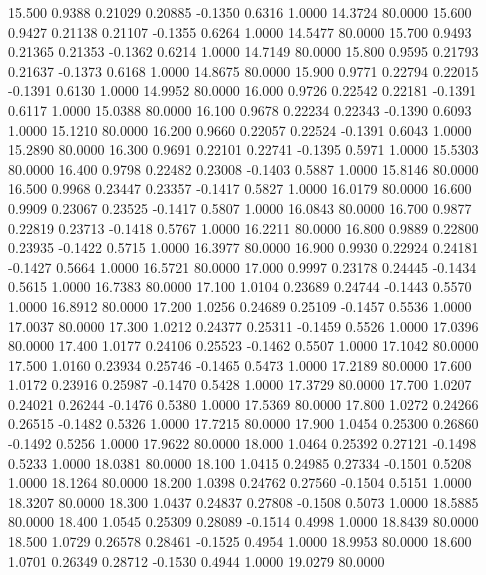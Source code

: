   15.500   0.9388   0.21029   0.20885  -0.1350   0.6316   1.0000  14.3724  80.0000
  15.600   0.9427   0.21138   0.21107  -0.1355   0.6264   1.0000  14.5477  80.0000
  15.700   0.9493   0.21365   0.21353  -0.1362   0.6214   1.0000  14.7149  80.0000
  15.800   0.9595   0.21793   0.21637  -0.1373   0.6168   1.0000  14.8675  80.0000
  15.900   0.9771   0.22794   0.22015  -0.1391   0.6130   1.0000  14.9952  80.0000
  16.000   0.9726   0.22542   0.22181  -0.1391   0.6117   1.0000  15.0388  80.0000
  16.100   0.9678   0.22234   0.22343  -0.1390   0.6093   1.0000  15.1210  80.0000
  16.200   0.9660   0.22057   0.22524  -0.1391   0.6043   1.0000  15.2890  80.0000
  16.300   0.9691   0.22101   0.22741  -0.1395   0.5971   1.0000  15.5303  80.0000
  16.400   0.9798   0.22482   0.23008  -0.1403   0.5887   1.0000  15.8146  80.0000
  16.500   0.9968   0.23447   0.23357  -0.1417   0.5827   1.0000  16.0179  80.0000
  16.600   0.9909   0.23067   0.23525  -0.1417   0.5807   1.0000  16.0843  80.0000
  16.700   0.9877   0.22819   0.23713  -0.1418   0.5767   1.0000  16.2211  80.0000
  16.800   0.9889   0.22800   0.23935  -0.1422   0.5715   1.0000  16.3977  80.0000
  16.900   0.9930   0.22924   0.24181  -0.1427   0.5664   1.0000  16.5721  80.0000
  17.000   0.9997   0.23178   0.24445  -0.1434   0.5615   1.0000  16.7383  80.0000
  17.100   1.0104   0.23689   0.24744  -0.1443   0.5570   1.0000  16.8912  80.0000
  17.200   1.0256   0.24689   0.25109  -0.1457   0.5536   1.0000  17.0037  80.0000
  17.300   1.0212   0.24377   0.25311  -0.1459   0.5526   1.0000  17.0396  80.0000
  17.400   1.0177   0.24106   0.25523  -0.1462   0.5507   1.0000  17.1042  80.0000
  17.500   1.0160   0.23934   0.25746  -0.1465   0.5473   1.0000  17.2189  80.0000
  17.600   1.0172   0.23916   0.25987  -0.1470   0.5428   1.0000  17.3729  80.0000
  17.700   1.0207   0.24021   0.26244  -0.1476   0.5380   1.0000  17.5369  80.0000
  17.800   1.0272   0.24266   0.26515  -0.1482   0.5326   1.0000  17.7215  80.0000
  17.900   1.0454   0.25300   0.26860  -0.1492   0.5256   1.0000  17.9622  80.0000
  18.000   1.0464   0.25392   0.27121  -0.1498   0.5233   1.0000  18.0381  80.0000
  18.100   1.0415   0.24985   0.27334  -0.1501   0.5208   1.0000  18.1264  80.0000
  18.200   1.0398   0.24762   0.27560  -0.1504   0.5151   1.0000  18.3207  80.0000
  18.300   1.0437   0.24837   0.27808  -0.1508   0.5073   1.0000  18.5885  80.0000
  18.400   1.0545   0.25309   0.28089  -0.1514   0.4998   1.0000  18.8439  80.0000
  18.500   1.0729   0.26578   0.28461  -0.1525   0.4954   1.0000  18.9953  80.0000
  18.600   1.0701   0.26349   0.28712  -0.1530   0.4944   1.0000  19.0279  80.0000
